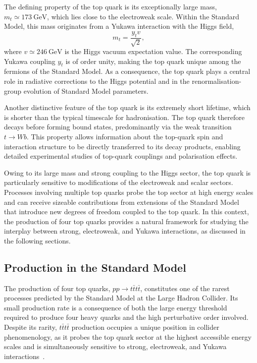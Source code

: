 The defining property of the top quark is its exceptionally large mass,
$m_t \simeq 173~\mathrm{GeV}$,
which lies close to the electroweak scale.
Within the Standard Model, this mass originates from a Yukawa interaction with the Higgs field,
\begin{equation}
m_t = \frac{y_t v}{\sqrt{2}},
\end{equation}
where $v \simeq 246~\mathrm{GeV}$ is the Higgs vacuum expectation value.
The corresponding Yukawa coupling $y_t$ is of order unity,
making the top quark unique among the fermions of the Standard Model.
As a consequence, the top quark plays a central role in radiative corrections to the Higgs potential
and in the renormalisation-group evolution of Standard Model parameters.

Another distinctive feature of the top quark is its extremely short lifetime,
which is shorter than the typical timescale for hadronisation.
The top quark therefore decays before forming bound states,
predominantly via the weak transition $t \to W b$.
This property allows information about the top-quark spin and interaction structure
to be directly transferred to its decay products,
enabling detailed experimental studies of top-quark couplings and polarisation effects.

Owing to its large mass and strong coupling to the Higgs sector,
the top quark is particularly sensitive to modifications of the electroweak and scalar sectors.
Processes involving multiple top quarks probe the top sector at high energy scales
and can receive sizeable contributions from extensions of the Standard Model
that introduce new degrees of freedom coupled to the top quark.
In this context, the production of four top quarks provides a natural framework
for studying the interplay between strong, electroweak, and Yukawa interactions,
as discussed in the following sections.

\subsection{\tttthead{} Production in the Standard Model}

The production of four top quarks, $pp \to t\bar{t}t\bar{t}$, constitutes one of the rarest processes predicted by the Standard Model at the Large Hadron Collider.
Its small production rate is a consequence of both the large energy threshold required to produce four heavy quarks and the high perturbative order involved.
Despite its rarity, $t\bar{t}t\bar{t}$ production occupies a unique position in collider phenomenology, 
as it probes the top quark sector at the highest accessible energy scales and is simultaneously sensitive to strong, electroweak, and Yukawa interactions~\cite{Blekman2022FourTopLHC}.

